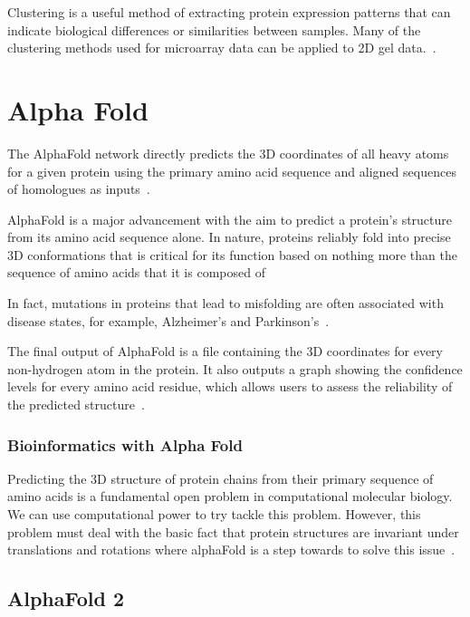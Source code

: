 \documentclass{report}
\begin{document}
Clustering is a useful method of extracting protein expression patterns that can indicate biological differences or similarities between samples. Many of the clustering methods used for microarray data can be applied to 2D gel data.~\cite{zvelebil_understanding_2008}.

\section{Alpha Fold}

The AlphaFold network directly predicts the 3D coordinates of all heavy atoms for a given protein using the primary amino acid sequence and aligned sequences of homologues as inputs~\cite{jumper_highly_2021}.

AlphaFold is a major advancement with the aim to predict a protein’s structure from its amino acid sequence alone. In nature, proteins reliably fold into precise 3D conformations that is critical for its function based on nothing more than the sequence of amino acids that it is composed of\cite{felix_brief_nodate}

In fact, mutations in proteins that lead to misfolding are often associated with disease states, for example, Alzheimer’s and Parkinson’s~\cite{felix_brief_nodate}.

The final output of AlphaFold is a file containing the 3D coordinates for every non-hydrogen atom in the protein. It also outputs a graph showing the confidence levels for every amino acid residue, which allows users to assess the reliability of the predicted structure~\cite{felix_brief_nodate}.

\subsubsection{Bioinformatics with Alpha Fold}

Predicting the 3D structure of protein chains from their primary sequence of amino acids is a fundamental open problem in computational molecular biology. We can use computational power to try tackle this problem. However, this problem must deal with the basic fact that protein structures are invariant under translations and rotations where alphaFold is a step towards to solve this issue~\cite{baldi_principled_nodate}.

\subsection{AlphaFold 2}
\end{document}
